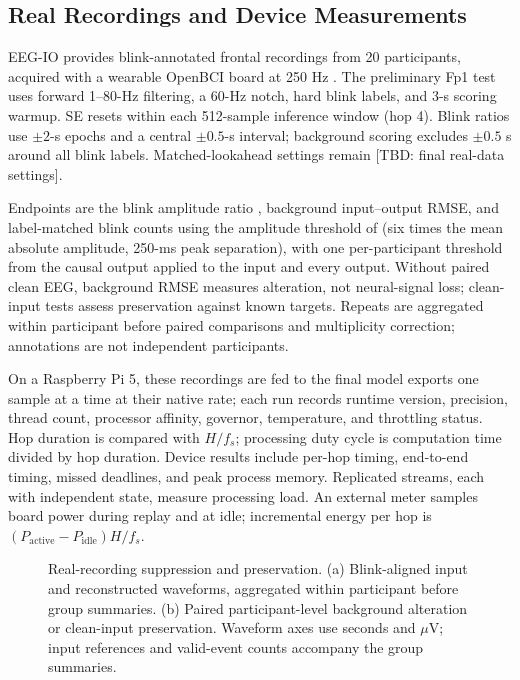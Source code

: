 \documentclass[letterpaper,journal]{IEEEtran}
\newcommand{\TBD}[1]{\textcolor{blue!65!black}{\textnormal{[TBD: #1]}}}
\newcommand{\figblank}[1]{%
  \fbox{\parbox[c][#1][c]{\dimexpr\linewidth-2\fboxsep-2\fboxrule\relax}{\centering\color{gray}\small Figure reserved}}}
\begin{document}
\subsection{Real Recordings and Device Measurements}
EEG-IO provides blink-annotated frontal recordings from 20 participants, acquired with a wearable OpenBCI board at 250 Hz \cite{agarwal2019blink}. The preliminary Fp1 test uses forward 1--80-Hz filtering, a 60-Hz notch, hard blink labels, and 3-s scoring warmup. SE resets within each 512-sample inference window (hop 4). Blink ratios use $\pm2$-s epochs and a central $\pm0.5$-s interval; background scoring excludes $\pm0.5$ s around all blink labels. Matched-lookahead settings remain \TBD{final real-data settings}.

Endpoints are the blink amplitude ratio \cite{robbins2020sensitive}, background input--output RMSE, and label-matched blink counts using the amplitude threshold of \cite{hazarika2024easr} (six times the mean absolute amplitude, 250-ms peak separation), with one per-participant threshold from the causal output applied to the input and every output. Without paired clean EEG, background RMSE measures alteration, not neural-signal loss; clean-input tests assess preservation against known targets. Repeats are aggregated within participant before paired comparisons and multiplicity correction; annotations are not independent participants.

On a Raspberry Pi 5, these recordings are fed to the final model exports one sample at a time at their native rate; each run records runtime version, precision, thread count, processor affinity, governor, temperature, and throttling status. Hop duration is compared with $H/f_s$; processing duty cycle is computation time divided by hop duration. Device results include per-hop timing, end-to-end timing, missed deadlines, and peak process memory. Replicated streams, each with independent state, measure processing load. An external meter samples board power during replay and at idle; incremental energy per hop is $(P_{\mathrm{active}}-P_{\mathrm{idle}})H/f_s$.

\begin{figure}[t]
\centering
\figblank{28mm}
\caption{Real-recording suppression and preservation. (a) Blink-aligned input and reconstructed waveforms, aggregated within participant before group summaries. (b) Paired participant-level background alteration or clean-input preservation. Waveform axes use seconds and $\mu$V; input references and valid-event counts accompany the group summaries.}
\label{fig:real}
\end{figure}
\end{document}
